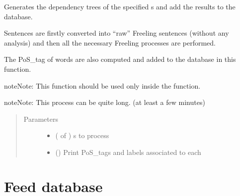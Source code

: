 \documentclass[letterpaper,10pt,english]{sphinxmanual}
\begin{document}
\begin{fulllineitems}
\label{\detokenize{process:loacore.process.deptree_process.add_dep_tree_from_sentences}}
Generates the dependency trees of the specified  s and add the results to the
database.

Sentences are firstly converted into “raw” Freeling sentences (without any analysis) and then all the necessary
Freeling processes are performed.

The PoS\_tag of words are also computed and added to the database in this function.

\begin{sphinxadmonition}{note}{Note:}
This function should be used only inside the  function.
\end{sphinxadmonition}

\begin{sphinxadmonition}{note}{Note:}
This process can be quite long. (at least a few minutes)
\end{sphinxadmonition}
\begin{quote}\begin{description}
\item[{Parameters}] \leavevmode\begin{itemize}
\item {} 
 ( of ) \textendash{}  s to process

\item {} 
 () \textendash{} Print PoS\_tags and labels associated to each 

\end{itemize}

\end{description}\end{quote}

\end{fulllineitems}



\section{Feed database}
\label{\detokenize{process:module-loacore.process.file_process}}\label{\detokenize{process:feed-database}}
\end{document}
